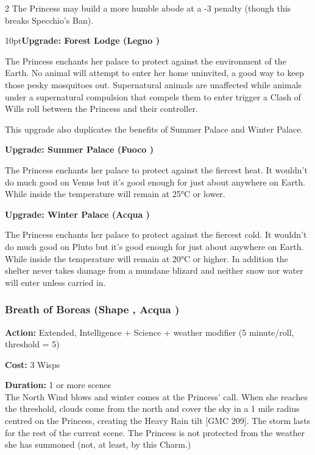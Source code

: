 \begin{multicols}{2}
The Princess may build a more humble abode at a -3 penalty (though this breaks Specchio's Ban).

\begin{myindentpar}{10pt}\textbf{Upgrade: Forest Lodge (Legno \textbullet)}

The Princess enchants her palace to protect against the environment of the Earth. No animal will attempt to enter her home uninvited, a good way to keep those pesky mosquitoes out. Supernatural animals are unaffected while animals under a supernatural compulsion that compels them to enter trigger a Clash of Wills roll between the Princess and their controller. 

This upgrade also duplicates the benefits of Summer Palace and Winter Palace.

\textbf{Upgrade: Summer Palace (Fuoco \textbullet\textbullet)}

The Princess enchants her palace to protect against the fiercest heat. It wouldn't do much good on Venus but it's good enough for just about anywhere on Earth. While inside the temperature will remain at 25°C or lower.

\textbf{Upgrade: Winter Palace (Acqua \textbullet\textbullet)}

The Princess enchants her palace to protect against the fiercest cold. It wouldn't do much good on Pluto but it's good enough for just about anywhere on Earth. While inside the temperature will remain at 20°C or higher. In addition the shelter never takes damage from a mundane blizard and neither snow nor water will enter unless carried in.

\end{myindentpar}

\subsubsection*{Breath of Boreas (Shape \textbullet\textbullet\textbullet\textbullet, Acqua \textbullet\textbullet\textbullet)}

\noindent \textbf{Action:} Extended, Intelligence + Science + weather modifier (5 minute/roll, threshold = 5)

\noindent \textbf{Cost:} 3 Wisps

\noindent \textbf{Duration:} 1 or more scenes\\

\noindent The North Wind blows and winter comes at the Princess' call. When she reaches the threshold, clouds come from the north and cover the sky in a 1 mile radius centred on the Princess, creating the Heavy Rain tilt [GMC 209]. The storm lasts for the rest of the current scene. The Princess is not protected from the weather she has summoned (not, at least, by this Charm.)


\end{multicols}
